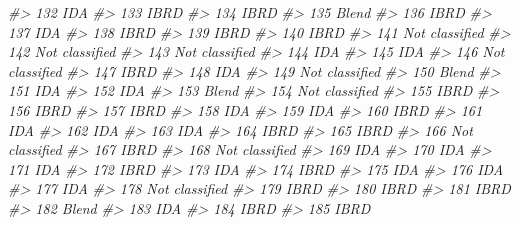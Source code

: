 \documentclass[
  xelatex, ja=standard]{bxjsbook}
\newenvironment{Shaded}{\begin{snugshade}}{\end{snugshade}}
\newcommand{\CommentTok}[1]{\textcolor[rgb]{0.56,0.35,0.01}{\textit{#1}}}
\theoremstyle{definition}
\theoremstyle{definition}
\theoremstyle{definition}
\theoremstyle{definition}
\theoremstyle{remark}
\begin{document}
\begin{Shaded}
\begin{Highlighting}[]
\CommentTok{\#\textgreater{} 132            IDA}
\CommentTok{\#\textgreater{} 133           IBRD}
\CommentTok{\#\textgreater{} 134           IBRD}
\CommentTok{\#\textgreater{} 135          Blend}
\CommentTok{\#\textgreater{} 136           IBRD}
\CommentTok{\#\textgreater{} 137            IDA}
\CommentTok{\#\textgreater{} 138           IBRD}
\CommentTok{\#\textgreater{} 139           IBRD}
\CommentTok{\#\textgreater{} 140           IBRD}
\CommentTok{\#\textgreater{} 141 Not classified}
\CommentTok{\#\textgreater{} 142 Not classified}
\CommentTok{\#\textgreater{} 143 Not classified}
\CommentTok{\#\textgreater{} 144            IDA}
\CommentTok{\#\textgreater{} 145            IDA}
\CommentTok{\#\textgreater{} 146 Not classified}
\CommentTok{\#\textgreater{} 147           IBRD}
\CommentTok{\#\textgreater{} 148            IDA}
\CommentTok{\#\textgreater{} 149 Not classified}
\CommentTok{\#\textgreater{} 150          Blend}
\CommentTok{\#\textgreater{} 151            IDA}
\CommentTok{\#\textgreater{} 152            IDA}
\CommentTok{\#\textgreater{} 153          Blend}
\CommentTok{\#\textgreater{} 154 Not classified}
\CommentTok{\#\textgreater{} 155           IBRD}
\CommentTok{\#\textgreater{} 156           IBRD}
\CommentTok{\#\textgreater{} 157           IBRD}
\CommentTok{\#\textgreater{} 158            IDA}
\CommentTok{\#\textgreater{} 159            IDA}
\CommentTok{\#\textgreater{} 160           IBRD}
\CommentTok{\#\textgreater{} 161            IDA}
\CommentTok{\#\textgreater{} 162            IDA}
\CommentTok{\#\textgreater{} 163            IDA}
\CommentTok{\#\textgreater{} 164           IBRD}
\CommentTok{\#\textgreater{} 165           IBRD}
\CommentTok{\#\textgreater{} 166 Not classified}
\CommentTok{\#\textgreater{} 167           IBRD}
\CommentTok{\#\textgreater{} 168 Not classified}
\CommentTok{\#\textgreater{} 169            IDA}
\CommentTok{\#\textgreater{} 170            IDA}
\CommentTok{\#\textgreater{} 171            IDA}
\CommentTok{\#\textgreater{} 172           IBRD}
\CommentTok{\#\textgreater{} 173            IDA}
\CommentTok{\#\textgreater{} 174           IBRD}
\CommentTok{\#\textgreater{} 175            IDA}
\CommentTok{\#\textgreater{} 176            IDA}
\CommentTok{\#\textgreater{} 177            IDA}
\CommentTok{\#\textgreater{} 178 Not classified}
\CommentTok{\#\textgreater{} 179           IBRD}
\CommentTok{\#\textgreater{} 180           IBRD}
\CommentTok{\#\textgreater{} 181           IBRD}
\CommentTok{\#\textgreater{} 182          Blend}
\CommentTok{\#\textgreater{} 183            IDA}
\CommentTok{\#\textgreater{} 184           IBRD}
\CommentTok{\#\textgreater{} 185           IBRD}

\end{Highlighting}
\end{Shaded}
\end{document}

